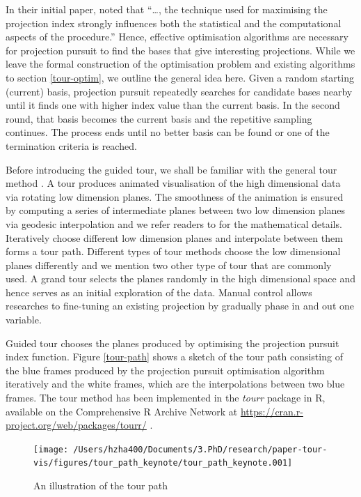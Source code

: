 \documentclass[12pt]{article}
\begin{document}
In their initial paper, \citet{friedman1974projection} noted that
``\ldots{}, the technique used for maximising the projection index
strongly influences both the statistical and the computational aspects
of the procedure.'' Hence, effective optimisation algorithms are
necessary for projection pursuit to find the bases that give interesting
projections. While we leave the formal construction of the optimisation
problem and existing algorithms to section \ref{tour-optim}, we outline
the general idea here. Given a random starting (current) basis,
projection pursuit repeatedly searches for candidate bases nearby until
it finds one with higher index value than the current basis. In the
second round, that basis becomes the current basis and the repetitive
sampling continues. The process ends until no better basis can be found
or one of the termination criteria is reached.

Before introducing the guided tour, we shall be familiar with the
general tour method \citep{cook2008grand}. A tour produces animated
visualisation of the high dimensional data via rotating low dimension
planes. The smoothness of the animation is ensured by computing a series
of intermediate planes between two low dimension planes via geodesic
interpolation and we refer readers to \citet{buja2005computational} for
the mathematical details. Iteratively choose different low dimension
planes and interpolate between them forms a tour path. Different types
of tour methods choose the low dimensional planes differently and we
mention two other type of tour that are commonly used. A grand tour
selects the planes randomly in the high dimensional space and hence
serves as an initial exploration of the data. Manual control allows
researches to fine-tuning an existing projection by gradually phase in
and out one variable.

Guided tour chooses the planes produced by optimising the projection
pursuit index function. Figure \ref{tour-path} shows a sketch of the
tour path consisting of the blue frames produced by the projection
pursuit optimisation algorithm iteratively and the white frames, which
are the interpolations between two blue frames. The tour method has been
implemented in the \emph{tourr} package in R, available on the
Comprehensive R Archive Network at
\url{https://cran.r-project.org/web/packages/tourr/}
\citep{wickham2011tourrpackage}.

\begin{figure}
\texttt{[image: /Users/hzha400/Documents/3.PhD/research/paper-tour-vis/figures/tour\_path\_keynote/tour\_path\_keynote.001]} \caption{\label{tour-path}An illustration of the tour path}\label{fig:tour-path}
\end{figure}
\end{document}
